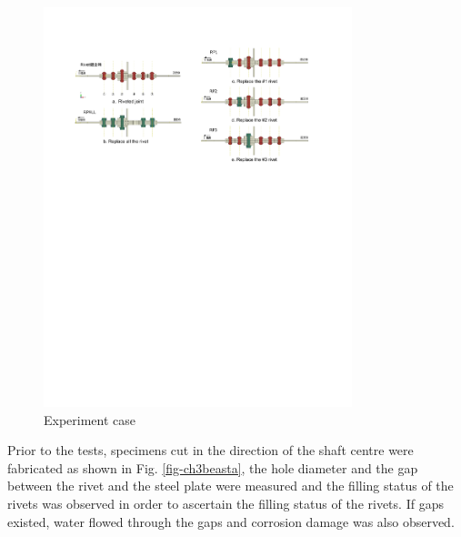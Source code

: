 \begin{figure}[htbp]
    \centering
    \includegraphics[width=0.8\textwidth]{imgs/ch3/riveexpcase.pdf}
    \caption{Experiment case}
    \label{fig:enter-label}
\end{figure}

Prior to the tests, specimens cut in the direction of the shaft centre were fabricated as shown in Fig. \ref{fig-ch3beasta}, the hole diameter and the gap between the rivet and the steel plate were measured and the filling status of the rivets was observed in order to ascertain the filling status of the rivets. If gaps existed, water flowed through the gaps and corrosion damage was also observed.

